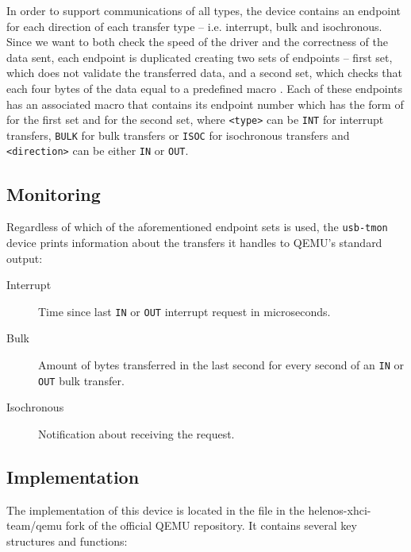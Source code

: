 In order to support communications of all types, the device contains an
endpoint for each direction of each transfer type -- i.e. interrupt, bulk and
isochronous. Since we want to both check the speed of the driver and the
correctness of the data sent, each endpoint is duplicated creating two
sets of endpoints -- first set, which does not validate the transferred data,
and a second set, which checks that each four bytes of the data equal to a
predefined macro . Each of these endpoints has an associated
macro that contains its endpoint number which has the form of
 for the first set and
 for the second set, where \texttt{<type>}
can be \texttt{INT} for interrupt transfers, \texttt{BULK} for bulk transfers or
\texttt{ISOC} for isochronous transfers and \texttt{<direction>} can be either
\texttt{IN} or \texttt{OUT}.

\subsection{Monitoring}

Regardless of which of the aforementioned endpoint sets is used, the
\texttt{usb-tmon} device prints information about the transfers it handles
to QEMU's standard output:
~
\begin{description}
	\item[Interrupt]
		Time since last \texttt{IN} or \texttt{OUT} interrupt request in
		microseconds.
	\item[Bulk]
		Amount of bytes transferred in the last second for every second of an
		\texttt{IN} or \texttt{OUT} bulk transfer.
	\item[Isochronous]
		Notification about receiving the request.
\end{description}

\subsection{Implementation}

The implementation of this device is located in the file
 in the helenos-xhci-team/qemu fork of
the official QEMU repository. It contains several key structures and functions:

